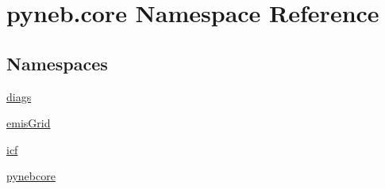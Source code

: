 \hypertarget{namespacepyneb_1_1core}{}\section{pyneb.\+core Namespace Reference}
\label{namespacepyneb_1_1core}
\subsection*{Namespaces}
\begin{DoxyCompactItemize}
\item 
 \hyperlink{namespacepyneb_1_1core_1_1diags}{diags}
\item 
 \hyperlink{namespacepyneb_1_1core_1_1emis_grid}{emis\+Grid}
\item 
 \hyperlink{namespacepyneb_1_1core_1_1icf}{icf}
\item 
 \hyperlink{namespacepyneb_1_1core_1_1pynebcore}{pynebcore}
\end{DoxyCompactItemize}
